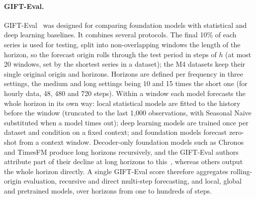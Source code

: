 \paragraph{GIFT-Eval.}
GIFT-Eval~\citep{aksu2024gifteval} was designed for comparing foundation models
with statistical and deep learning baselines. It combines several protocols.
The final 10\% of each series is used for testing, split into non-overlapping
windows the length of the horizon, so the forecast origin rolls through the
test period in steps of $h$ (at most 20 windows, set by the shortest series in
a dataset); the M4 datasets keep their single original origin and horizons.
Horizons are defined per frequency in three settings, the medium and long
settings being 10 and 15 times the short one (for hourly data, 48, 480 and 720
steps). Within a window each model forecasts the whole horizon in its own way:
local statistical models are fitted to the history before the window (truncated
to the last 1{,}000 observations, with Seasonal Naive substituted when a model
times out); deep learning models are trained once per dataset and condition on
a fixed context; and foundation models forecast zero-shot from a context
window. Decoder-only foundation models such as Chronos and TimesFM produce long
horizons recursively, and the GIFT-Eval authors attribute part of their decline
at long horizons to this~\citep{aksu2024gifteval}, whereas others output the
whole horizon directly. A single GIFT-Eval score therefore aggregates
rolling-origin evaluation, recursive and direct multi-step forecasting, and
local, global and pretrained models, over horizons from one to hundreds of
steps.

